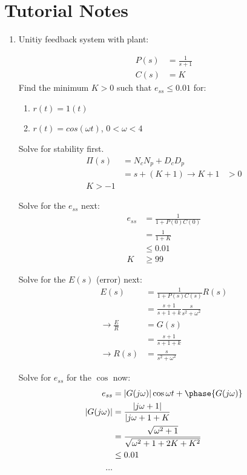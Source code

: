 \section{Tutorial Notes}
    \begin{enumerate}
        \item Unitiy feedback system with plant:

            \begin{align*}
                P(s) &= \frac{1}{s+1} \\
                C(s) &= K
            \end{align*}
            Find the minimum $K>0$ such that $e_{ss} \le 0.01$ for:
            \begin{enumerate}
                \item $r(t) = 1(t)$
                \item $r(t) = cos(\omega t)$, $0 < \omega < 4$
            \end{enumerate}

            Solve for stability first.
            \begin{align*}
                \Pi(s) &= N_c N_p + D_c D_p \\
                &= s + (K + 1)
                \rightarrow K+1 &> 0 \\
                K > -1
            \end{align*}

            Solve for the $e_{ss}$ next:
            \begin{align*}
                e_{ss} &= \frac{1}{1+P(0)C(0)} \\
                &= \frac{1}{1+K} \\
                & \le 0.01 \\
                K &\ge 99
            \end{align*}


            Solve for the $E(s)$ (error) next:
            \begin{align*}
                E(s) &= \frac{1}{1+P(s)C(s)} R(s) \\
                &= \frac{s+1}{s+1+k} \frac{s}{s^2 + \omega ^2} \\
                \rightarrow \frac{E}{R} &= G(s) \\
                &= \frac{s+1}{s+1+k} \\
                \rightarrow R(s) &= \frac{s}{s^2 + \omega ^2}
            \end{align*}

            Solve for $e_{ss}$ for the $\cos$ now:
            \begin{align*}
                e_{ss} &= |G(j\omega)| \cos{\omega t + \phase{G(j\omega)}} \\
                |G(j\omega)| &= \frac{|j \omega + 1|}{|j \omega + 1 + K} \\
                &= \frac{\sqrt{\omega^2 + 1}}{\sqrt{\omega^2 + 1 + 2K + K^2}} \\
                &\le 0.01 \\
                ...
            \end{align*}
    \end{enumerate}
\newpage

